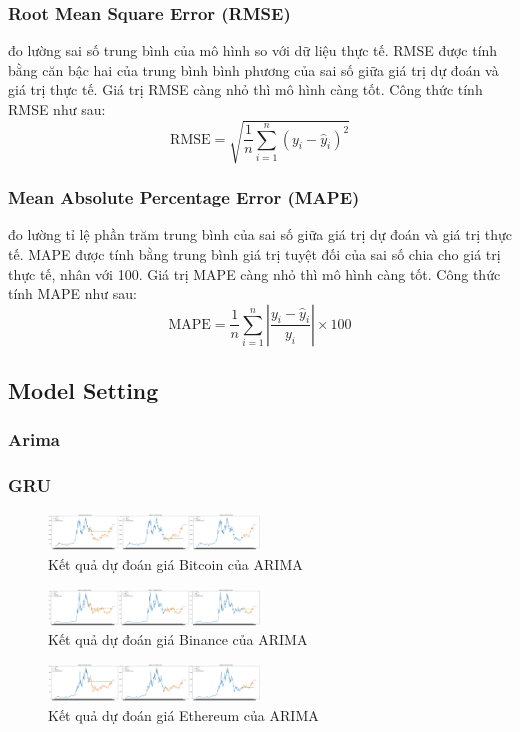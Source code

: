 \documentclass[conference]{IEEEtran}
\begin{document}
\subsubsection{Root Mean Square Error (RMSE)} đo lường sai số trung bình của mô hình so với dữ liệu thực tế. RMSE được tính bằng căn bậc hai của trung bình bình phương của sai số giữa giá trị dự đoán và giá trị thực tế. Giá trị RMSE càng nhỏ thì mô hình càng tốt. Công thức tính RMSE như sau:
\[
\text{RMSE} = \sqrt{\frac{1}{n} \sum_{i=1}^{n} (y_i - \hat{y}_i)^2}
\]
\subsubsection{Mean Absolute Percentage Error (MAPE)} đo lường tỉ lệ phần trăm trung bình của sai số giữa giá trị dự đoán và giá trị thực tế. MAPE được tính bằng trung bình giá trị tuyệt đối của sai số chia cho giá trị thực tế, nhân với 100. Giá trị MAPE càng nhỏ thì mô hình càng tốt. Công thức tính MAPE như sau:
\[
\text{MAPE} = \frac{1}{n} \sum_{i=1}^{n} \left| \frac{y_i - \hat{y}_i}{y_i} \right| \times 100
\]

\subsection{Model Setting}

\subsubsection{Arima}

\subsubsection{GRU}
\begin{figure}[H]
    \centering
    \includegraphics[width=0.5\textwidth]{bibliography/Figure/ARIMA_BTC_90.png}
    \caption{Kết quả dự đoán giá Bitcoin của ARIMA}
\end{figure}
\begin{figure}[H]
    \centering
    \includegraphics[width=0.5\textwidth]{bibliography/Figure/ARIMA_BNB_90.png}
    \caption{Kết quả dự đoán giá Binance của ARIMA}
\end{figure}
\begin{figure}[H]
    \centering
    \includegraphics[width=0.5\textwidth]{bibliography/Figure/ARIMA_ETH_90.png}
    \caption{Kết quả dự đoán giá Ethereum của ARIMA}
\end{figure}
\end{document}

